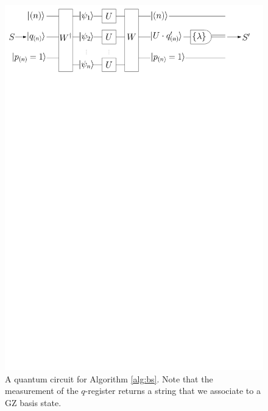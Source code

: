 \begin{figure}
\includegraphics[width=\linewidth]{noisy_circuit/noiseless_circuit_irrep}
\caption{
A quantum circuit for Algorithm \ref{alg:bs}. 
Note that the measurement of the $q$-register returns a string that we associate to a GZ basis state.}
\label{fig:bs}
\end{figure}

